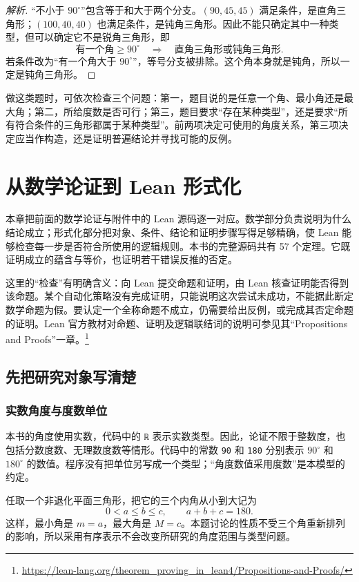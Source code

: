 \documentclass[UTF8,a4paper,zihao=-4,oneside,openany,fontset=fandol]{ctexbook}
\theoremstyle{definition}
\theoremstyle{remark}
\begin{document}
\begin{proof}[解析]
“不小于 $90^\circ$”包含等于和大于两个分支。$(90,45,45)$ 满足条件，是直角三角形；$(100,40,40)$ 也满足条件，是钝角三角形。因此不能只确定其中一种类型，但可以确定它不是锐角三角形，即
\[
\text{有一个角}\ge90^\circ
\quad\Longrightarrow\quad
\text{直角三角形或钝角三角形}.
\]
若条件改为“有一个角大于 $90^\circ$”，等号分支被排除。这个角本身就是钝角，所以一定是钝角三角形。
\end{proof}

做这类题时，可依次检查三个问题：第一，题目说的是任意一个角、最小角还是最大角；第二，所给度数是否可行；第三，题目要求“存在某种类型”，还是要求“所有符合条件的三角形都属于某种类型”。前两项决定可使用的角度关系，第三项决定应当作构造，还是证明普遍结论并寻找可能的反例。

\chapter{从数学论证到 Lean 形式化}
\label{chap:lean-explanation}

本章把前面的数学论证与附件中的 Lean 源码逐一对应。数学部分负责说明为什么结论成立；形式化部分把对象、条件、结论和证明步骤写得足够精确，使 Lean 能够检查每一步是否符合所使用的逻辑规则。本书的完整源码共有 57 个定理。它既证明成立的蕴含与等价，也证明若干错误反推的否定。

这里的“检查”有明确含义：向 Lean 提交命题和证明，由 Lean 核查证明能否得到该命题。某个自动化策略没有完成证明，只能说明这次尝试未成功，不能据此断定数学命题为假。要认定一个全称命题不成立，仍需要给出反例，或完成其否定命题的证明。Lean 官方教材对命题、证明及逻辑联结词的说明可参见其“Propositions and Proofs”一章。\footnote{\url{https://lean-lang.org/theorem_proving_in_lean4/Propositions-and-Proofs/}}

\section{先把研究对象写清楚}

\subsection{实数角度与度数单位}

本书的角度使用实数，代码中的 \texttt{ℝ} 表示实数类型。因此，论证不限于整数度，也包括分数度数、无理数度数等情形。代码中的常数 \texttt{90} 和 \texttt{180} 分别表示 $90^\circ$ 和 $180^\circ$ 的数值。程序没有把单位另写成一个类型；“角度数值采用度数”是本模型的约定。

任取一个非退化平面三角形，把它的三个内角从小到大记为
\[
0<a\le b\le c,\qquad a+b+c=180.
\]
这样，最小角是 $m=a$，最大角是 $M=c$。本题讨论的性质不受三个角重新排列的影响，所以采用有序表示不会改变所研究的角度范围与类型问题。
\end{document}
